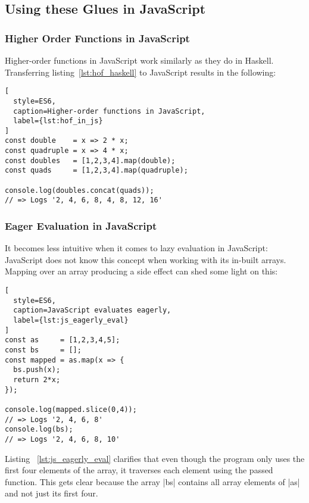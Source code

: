 \subsection{Using these Glues in JavaScript} %
\label{sub:Using these Glues in JavaScript}

\subsubsection{Higher Order Functions in JavaScript} %
\label{subsub:Higher Order Functions in JavaScript}
Higher-order functions in JavaScript work similarly as they do in Haskell.
Transferring listing~\ref{lst:hof_haskell} to JavaScript results in the
following:

\begin{lstlisting}[
  style=ES6,
  caption=Higher-order functions in JavaScript,
  label={lst:hof_in_js}
]
const double    = x => 2 * x;
const quadruple = x => 4 * x;
const doubles   = [1,2,3,4].map(double);
const quads     = [1,2,3,4].map(quadruple);

console.log(doubles.concat(quads));
// => Logs '2, 4, 6, 8, 4, 8, 12, 16'
\end{lstlisting}

\subsubsection{Eager Evaluation in JavaScript} %
\label{subsub:Eager Evaluation in JavaScript}

It becomes less intuitive when it comes to lazy evaluation in JavaScript:
JavaScript does not know this concept when working with its in-built arrays.
Mapping over an array producing a side effect can shed some light on this:

\begin{lstlisting}[
  style=ES6,
  caption=JavaScript evaluates eagerly,
  label={lst:js_eagerly_eval}
]
const as     = [1,2,3,4,5];
const bs     = [];
const mapped = as.map(x => {
  bs.push(x);
  return 2*x;
});

console.log(mapped.slice(0,4));
// => Logs '2, 4, 6, 8'
console.log(bs);
// => Logs '2, 4, 6, 8, 10'
\end{lstlisting}

Listing ~\ref{lst:js_eagerly_eval} clarifies that even though the program only
uses the first four elements of the array, it traverses each element using the
passed function. This gets clear because the array |bs| contains all array
elements of |as| and not just its first four.

